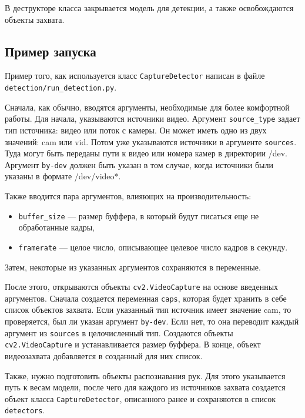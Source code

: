 \documentclass[12pt, a4paper]{article}
\begin{document}
В деструкторе класса закрывается модель для детекции, а также освобождаются объекты захвата.

\subsection{Пример запуска}
Пример того, как используется класс \texttt{CaptureDetector} написан в файле\\
\texttt{detection/run\_detection.py}.

Сначала, как обычно, вводятся аргументы, необходимые для более комфортной работы.
Для начала, указываются источники видео. Аргумент \texttt{source\_type} задает
тип источника: видео или поток с камеры. Он может иметь одно из двух значений:
cam или vid. Потом уже указываются источники в аргументе \texttt{sources}. Туда могут быть переданы пути к видео или номера камер в директории /dev. Аргумент \texttt{by-dev} должен быть указан в том случае, когда источники были указаны в формате /dev/video*.

Также вводится пара аргументов, влияющих на производительность:
\begin{itemize}
  \item \texttt{buffer\_size} --- размер буффера, в который будут писаться еще не обработанные кадры,
  \item \texttt{framerate} --- целое число, описывающее целевое число кадров в секунду.
\end{itemize}

Затем, некоторые из указанных аргументов сохраняются в переменные.

После этого, открываются объекты \texttt{cv2.VideoCapture} на основе введенных
аргументов. Сначала создается переменная \texttt{caps}, которая будет хранить в
себе список объектов захвата. Если указанный тип источник имеет значение cam,
то проверяется, был ли указан аргумент \texttt{by-dev}. Если нет, то она
переводит каждый аргумент из \texttt{sources} в целочисленный тип. Создаются
объекты \texttt{cv2.VideoCapture} и устанавливается размер буффера. В конце,
объект видеозахвата добавляется в созданный для них список.

Также, нужно подготовить объекты распознавания рук. Для этого указывается путь
к весам модели, после чего для каждого из источников захвата создается объект
класса \texttt{CaptureDetector}, описанного ранее и сохраняются в список \texttt{detectors}.
\end{document}
